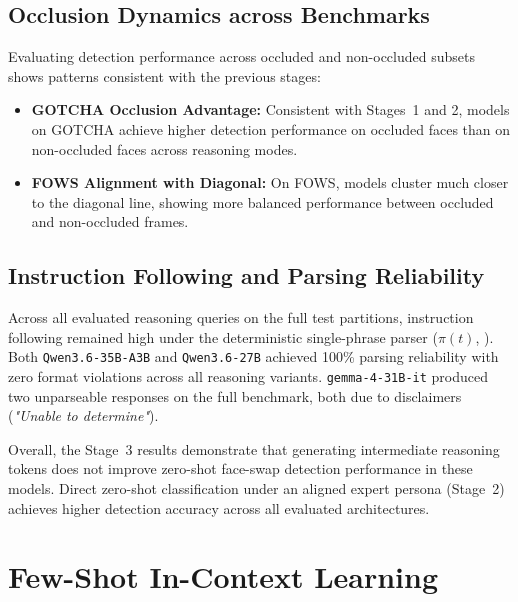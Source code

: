 \subsection{Occlusion Dynamics across Benchmarks}
\label{subsec:stage3_occlusion}

Evaluating detection performance across occluded and non-occluded subsets shows patterns consistent with the previous stages:
\begin{itemize}
    \item \textbf{GOTCHA Occlusion Advantage:} Consistent with Stages~1 and 2, models on GOTCHA achieve higher detection performance on occluded faces than on non-occluded faces across reasoning modes.
    \item \textbf{FOWS Alignment with Diagonal:} On FOWS, models cluster much closer to the diagonal line, showing more balanced performance between occluded and non-occluded frames.
\end{itemize}

\subsection{Instruction Following and Parsing Reliability}
\label{subsec:stage3_parsing}

Across all evaluated reasoning queries on the full test partitions, instruction following remained high under the deterministic single-phrase parser ($\pi(t)$, ). Both \texttt{Qwen3.6-35B-A3B} and \texttt{Qwen3.6-27B} achieved \num{100}\% parsing reliability with zero format violations across all reasoning variants. \texttt{gemma-4-31B-it} produced two unparseable responses on the full benchmark, both due to disclaimers (\emph{"Unable to determine"}).

Overall, the Stage~3 results demonstrate that generating intermediate reasoning tokens does not improve zero-shot face-swap detection performance in these models. Direct zero-shot classification under an aligned expert persona (Stage~2) achieves higher detection accuracy across all evaluated architectures.

\section{Few-Shot In-Context Learning}
\label{sec:results_fewshot}

